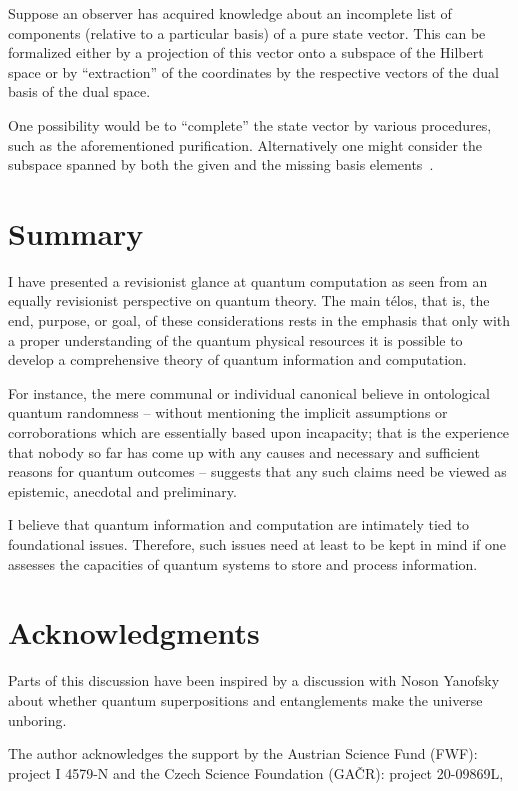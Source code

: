 \documentclass{ws-procs9x6}
\begin{document}
Suppose an observer has acquired knowledge about an incomplete list of components (relative to a particular basis) of a pure state vector.
This can be formalized either by a projection of this vector onto a subspace of the Hilbert space
or by ``extraction'' of the coordinates by the respective vectors of the dual basis of the dual space.

One possibility would be to ``complete'' the state vector by various procedures,
such as the aforementioned purification.
Alternatively one might consider the subspace spanned by both the given and the missing basis elements~\cite{havlicek-svozil-2020-dec}.


\section{Summary}


I have presented a revisionist glance at quantum computation as seen from an equally revisionist perspective on quantum theory.
The main  t\'elos, that is, the end, purpose, or goal, of these considerations rests in the emphasis that only with a proper understanding
of the quantum physical resources it is possible to develop a comprehensive theory of quantum information and computation.

For instance, the mere communal or individual canonical believe in ontological quantum randomness -- without mentioning the
implicit assumptions or corroborations which are essentially based upon incapacity; that is the experience that nobody so far has come up with any causes and
necessary and sufficient reasons for quantum outcomes -- suggests that any such claims need be viewed as epistemic, anecdotal and preliminary.

I believe that quantum information and computation are intimately tied to foundational issues.
Therefore, such issues need at least to be kept in mind if one assesses the capacities of quantum systems to store and process information.



\section*{Acknowledgments}
Parts of this discussion have been inspired by a discussion with Noson Yanofsky about
whether quantum superpositions and entanglements make the universe unboring.


The author acknowledges the support by the Austrian Science Fund (FWF): project I 4579-N and the Czech Science Foundation (GA\v CR): project 20-09869L,
\end{document}
